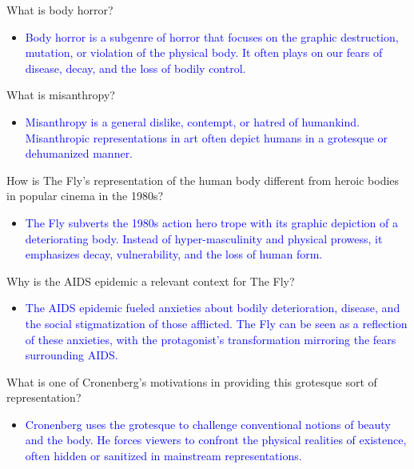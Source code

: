 \documentclass[11pt,fleqn]{book}
\begin{document}
\begin{exercise}
What is body horror?
\begin{itemize}
    \item \textcolor{blue}{Body horror is a subgenre of horror that focuses on the graphic destruction, mutation, or violation of the physical body. It often plays on our fears of  disease, decay, and the loss of bodily control.}
\end{itemize}
\end{exercise}

\begin{exercise}
What is misanthropy?
\begin{itemize}
    \item \textcolor{blue}{Misanthropy is a general dislike, contempt, or hatred of humankind.  Misanthropic representations in art often depict humans in a grotesque or dehumanized manner.}
\end{itemize}
\end{exercise}

\begin{exercise}
How is The Fly's representation of the human body different from heroic bodies in popular cinema in the 1980s?
\begin{itemize}
    \item \textcolor{blue}{The Fly subverts the 1980s action hero trope with its graphic depiction of a deteriorating body. Instead of hyper-masculinity and physical prowess, it emphasizes decay, vulnerability, and the loss of human form.}
\end{itemize}
\end{exercise}

\begin{exercise}
Why is the AIDS epidemic a relevant context for The Fly?
\begin{itemize}
    \item \textcolor{blue}{The AIDS epidemic fueled anxieties about bodily deterioration, disease, and the social stigmatization of those afflicted. The Fly can be seen as a reflection of these anxieties, with the protagonist's transformation mirroring the fears surrounding AIDS. }
\end{itemize}
\end{exercise}

\begin{exercise}
What is one of Cronenberg's motivations in providing this grotesque sort of representation?
\begin{itemize}
    \item \textcolor{blue}{Cronenberg uses the grotesque to challenge conventional notions of beauty and the body. He forces viewers to confront the physical realities of existence, often hidden or sanitized in mainstream representations. }
\end{itemize}
\end{exercise}
\end{document}
